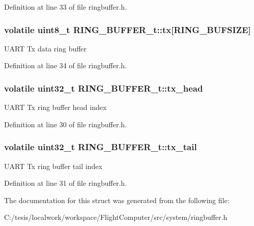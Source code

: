 \-Definition at line 33 of file ringbuffer.\-h.

\hypertarget{struct_r_i_n_g___b_u_f_f_e_r__t_a762848cc03fefa39625cf84ace599946}{
\subsubsection[{tx}]{\setlength{\rightskip}{0pt plus 5cm}volatile uint8\-\_\-t {\bf \-R\-I\-N\-G\-\_\-\-B\-U\-F\-F\-E\-R\-\_\-t\-::tx}\mbox{[}\-R\-I\-N\-G\-\_\-\-B\-U\-F\-S\-I\-Z\-E\mbox{]}}}\label{struct_r_i_n_g___b_u_f_f_e_r__t_a762848cc03fefa39625cf84ace599946}
\-U\-A\-R\-T \-Tx data ring buffer 

\-Definition at line 34 of file ringbuffer.\-h.

\hypertarget{struct_r_i_n_g___b_u_f_f_e_r__t_ac368c0b8959aee3fb4c3163b17adeefa}{
\subsubsection[{tx\-\_\-head}]{\setlength{\rightskip}{0pt plus 5cm}volatile uint32\-\_\-t {\bf \-R\-I\-N\-G\-\_\-\-B\-U\-F\-F\-E\-R\-\_\-t\-::tx\-\_\-head}}}\label{struct_r_i_n_g___b_u_f_f_e_r__t_ac368c0b8959aee3fb4c3163b17adeefa}
\-U\-A\-R\-T \-Tx ring buffer head index 

\-Definition at line 30 of file ringbuffer.\-h.

\hypertarget{struct_r_i_n_g___b_u_f_f_e_r__t_aa1a99ec292352d5e536ba7fd7d0ff7e7}{
\subsubsection[{tx\-\_\-tail}]{\setlength{\rightskip}{0pt plus 5cm}volatile uint32\-\_\-t {\bf \-R\-I\-N\-G\-\_\-\-B\-U\-F\-F\-E\-R\-\_\-t\-::tx\-\_\-tail}}}\label{struct_r_i_n_g___b_u_f_f_e_r__t_aa1a99ec292352d5e536ba7fd7d0ff7e7}
\-U\-A\-R\-T \-Tx ring buffer tail index 

\-Definition at line 31 of file ringbuffer.\-h.



\-The documentation for this struct was generated from the following file\-:\begin{DoxyCompactItemize}
\item 
\-C\-:/tesis/localwork/workspace/\-Flight\-Computer/src/system/ringbuffer.\-h\end{DoxyCompactItemize}
